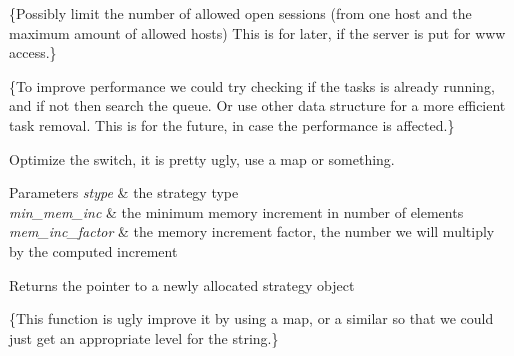 \begin{DoxyRefList}
\item[\label{todo__todo000020}%
\hypertarget{todo__todo000020}{}%
Member \hyperlink{classuva_1_1smt_1_1bpbd_1_1server_1_1trans__manager_a053a8f5be8b004358e5e20b3a1810efb}{uva\+:\+:smt\+:\+:bpbd\+:\+:server\+:\+:trans\+\_\+manager\+:\+:trans\+\_\+manager} (const size\+\_\+t num\+\_\+threads)]\{Possibly limit the number of allowed open sessions (from one host and the maximum amount of allowed hosts) This is for later, if the server is put for www access.\}  
\item[\label{todo__todo000022}%
\hypertarget{todo__todo000022}{}%
Member \hyperlink{classuva_1_1smt_1_1bpbd_1_1server_1_1trans__task__pool_a79d4c7977c98b55679b00ae18b6158f1}{uva\+:\+:smt\+:\+:bpbd\+:\+:server\+:\+:trans\+\_\+task\+\_\+pool\+:\+:notify\+\_\+task\+\_\+cancel} (trans\+\_\+task\+\_\+ptr \hyperlink{classuva_1_1smt_1_1bpbd_1_1server_1_1trans__task}{trans\+\_\+task})]\{To improve performance we could try checking if the tasks is already running, and if not then search the queue. Or use other data structure for a more efficient task removal. This is for the future, in case the performance is affected.\}  
\item[\label{todo__todo000001}%
\hypertarget{todo__todo000001}{}%
Member \hyperlink{namespaceuva_1_1utils_1_1containers_a04ae8ecdaffa42ace76f1c604659ba6c}{uva\+:\+:utils\+:\+:containers\+:\+:get\+\_\+mem\+\_\+incr\+\_\+strat} (const mem\+\_\+inc\+\_\+types\+\_\+enum stype, const size\+\_\+t min\+\_\+mem\+\_\+inc, const size\+\_\+t mem\+\_\+inc\+\_\+factor)]Optimize the switch, it is pretty ugly, use a map or something. 
\begin{DoxyParams}{Parameters}
{\em stype} & the strategy type \\
\hline
{\em min\+\_\+mem\+\_\+inc} & the minimum memory increment in number of elements \\
\hline
{\em mem\+\_\+inc\+\_\+factor} & the memory increment factor, the number we will multiply by the computed increment \\
\hline
\end{DoxyParams}
\begin{DoxyReturn}{Returns}
the pointer to a newly allocated strategy object  
\end{DoxyReturn}

\item[\label{todo__todo000021}%
\hypertarget{todo__todo000021}{}%
Member \hyperlink{classuva_1_1utils_1_1logging_1_1logger_a347abc5c02ffb08a5bfce9a3a23a233b}{uva\+:\+:utils\+:\+:logging\+:\+:logger\+:\+:set\+\_\+reporting\+\_\+level} (const string level)]\{This function is ugly improve it by using a map, or a similar so that we could just get an appropriate level for the string.\} 
\end{DoxyRefList}